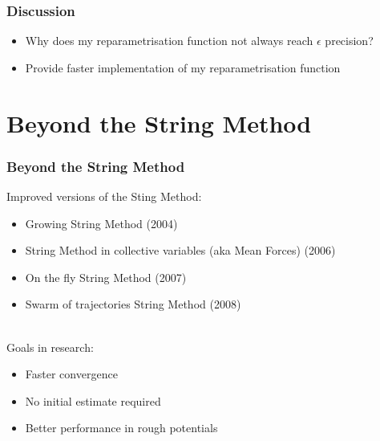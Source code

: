 \documentclass{beamer}
\renewcommand{\(}{\left(}
\renewcommand{\)}{\right)}
\begin{document}

\begin{frame}
\frametitle{Discussion}
\begin{itemize}
\item Why does my reparametrisation function not always reach $\epsilon$ precision?
\item Provide faster implementation of my reparametrisation function
\end{itemize}
\end{frame}

\section{Beyond the String Method}
\begin{frame}
\frametitle{Beyond the String Method}
Improved versions of the Sting Method:
\begin{itemize}
\item Growing String Method (2004)
\item String Method in collective variables (aka Mean Forces) (2006)
\item On the fly String Method (2007)
\item Swarm of trajectories String Method (2008)
%
\end{itemize}
~\\
Goals in research:
\begin{itemize}
\item Faster convergence
\item No initial estimate required
\item Better performance in rough potentials
\end{itemize}
\end{frame}
\end{document}
